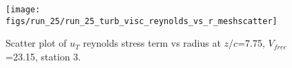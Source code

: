 \begin{figure}[H]
\centering
\texttt{[image: figs/run\_25/run\_25\_turb\_visc\_reynolds\_vs\_r\_meshscatter]}
\caption{Scatter plot of $
u_T$ reynolds stress term vs radius at $z/c$=7.75, $V_{free}$=23.15, station 3.}
\label{fig:run_25_turb_visc_reynolds_vs_r_meshscatter}
\end{figure}


